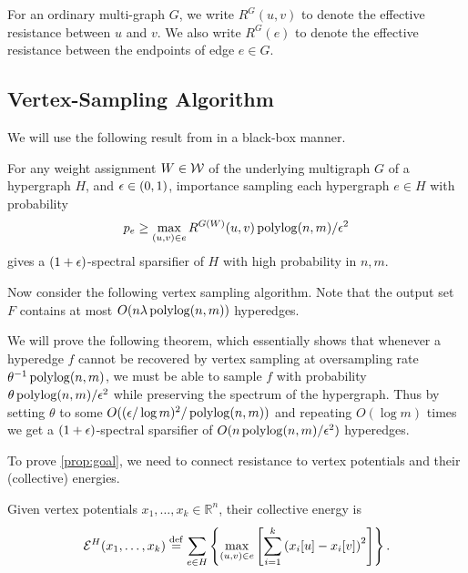 \documentclass{article}
\begin{document}
For an ordinary multi-graph $G$, we write $R^G(u,v)$ to denote the effective resistance
between $u$ and $v$. We also write $R^G(e)$ to denote the effective resistance
between the endpoints of edge $e\in G$.

\subsection{Vertex-Sampling Algorithm}

We will use the following result from \cite{JambulapatiLS23} in a black-box manner.

\begin{theorem}\label{thm:JLS23}
    For any weight assignment $W\in \mathcal{W}$ of the underlying multigraph
    $G$ of a hypergraph $H$, and $\epsilon\in(0,1)$,
    importance sampling each hypergraph $e\in H$ with probability
    \begin{align*}
        p_e \geq \max_{(u,v)\in e} R^{G(W)}(u,v) \operatorname{polylog}(n,m)/\epsilon^2
    \end{align*}
    gives a $(1+\epsilon)$-spectral sparsifier of $H$ with high probability
    in $n,m$.
\end{theorem}

Now consider the following vertex sampling algorithm.
Note that the output set $F$ contains at most
$O(n \lambda \operatorname{polylog}(n,m))$ hyperedges.

\quad

\vsov*
\quad

We will prove the following theorem, which essentially shows that
whenever a hyperedge $f$ cannot be recovered by vertex sampling
at oversampling rate $\theta^{-1}\operatorname{polylog}(n,m)$,
we must be able to sample $f$
with probability $\theta \operatorname{polylog}(n,m) / \epsilon^2$
while preserving the spectrum of the hypergraph.
Thus by setting $\theta$ to some $O((\epsilon/\log m)^2 / \operatorname{polylog}(n,m))$ and repeating
$O(\log m)$ times we get a $(1+\epsilon)$-spectral sparsifier
of $O(n\operatorname{polylog}(n,m)/\epsilon^2)$ hyperedges.

\keythmov*



To prove \cref{prop:goal}, we need to connect resistance to vertex potentials
and their (collective) energies.



\begin{definition}
    Given vertex potentials $x_1,\ldots,x_k\in\mathbb{R}^{n}$,
    their collective energy is
    \begin{align*}
        \mathcal{E}^H(x_1,\ldots,x_k) \stackrel{\mathrm{def}}{=}
        \sum_{e\in H}
        \left\{\max_{(u,v)\in e} \left[
        \sum_{i=1}^{k} \left(x_i[u] - x_i[v]\right)^2
        \right]  \right\}.
    \end{align*}
\end{definition}
\end{document}
